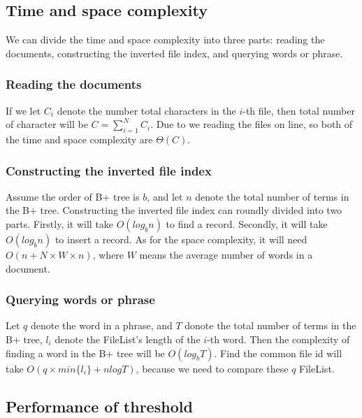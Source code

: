 \documentclass[12pt]{article}
\begin{document}
\subsection{Time and space complexity}
We can divide the time and space complexity into three parts: reading the documents, constructing the inverted file index, and querying words or phrase.
\subsubsection{Reading the documents}
If we let $C_i$ denote the number total characters in the $i$-th file, then total number of character will be $C=\sum\limits_{i=1}^NC_i$. Due to we reading the files on line, so both of the time and space complexity are $\Theta(C)$.
\subsubsection{Constructing the inverted file index}
Assume the order of B+ tree is $b$, and let $n$ denote the total number of terms in the B+ tree. Constructing the inverted file index can roundly divided into two parts. Firstly, it will take $O(log_b n)$ to find a record. Secondly, it will take $O(log_b n)$ to insert a record. As for the space complexity, it will need $O(n+ N\times W \times n)$, where $W$ means the average number of words in a document.

\subsubsection{Querying words or phrase}
Let $q$ denote the word in a phrase, and $T$ donote the total number of terms in the B+ tree, $l_i$ denote the FileList's length of the $i$-th word.  Then the complexity of finding a word in the B+ tree will be $O(log_b T)$. Find the common file id will take $O(q\times min\{l_i\} + nlog T)$, because we need to compare these $q$ FileList.
\subsection{Performance of threshold}
\end{document}
